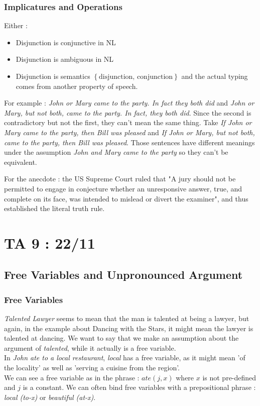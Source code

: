 \documentclass{cours}
\begin{document}
\subsubsection{Implicatures and Operations}
Either\! : 
\begin{itemize}
    \item Disjunction is conjunctive in NL
    \item Disjunction is ambiguous in NL
    \item Disjunction is semantics $\left\{\text{disjunction, conjunction}\right\}$ and the actual typing comes from another property of speech. 
\end{itemize}

For example\! : \textsl{John or Mary came to the party. In fact they both did} and \textsl{John or Mary, but not both, came to the party. In fact, they both did}. Since the second is contradictory but not the first, they can't mean the same thing. 
Take \textsl{If John or Mary came to the party, then Bill was pleased} and \textsl{If John or Mary, but not both, came to the party, then Bill was pleased}. Those sentences have different meanings under the assumption \textsl{John and Mary came to the party} so they can't be equivalent. 

For the anecdote\! : the US Supreme Court ruled that "A jury should not be permitted to engage in conjecture whether an unresponsive answer, true, and complete on its face, was intended to mislead or divert the examiner", and thus established the literal truth rule. 

\section{TA 9\! : 22/11}
\subsection{Free Variables and Unpronounced Argument}
\subsubsection{Free Variables}
\textsl{Talented Lawyer} seems to mean that the man is talented at being a lawyer, but again, in the example about Dancing with the Stars, it might mean the lawyer is talented at dancing. We want to say that we make an assumption about the argument of \textsl{talented}, while it actually is a free variable. \\
In \textsl{John ate to a local restaurant}, \textsl{local} has a free variable, as it might mean 'of the locality' as well as 'serving a cuisine from the region'.\\
We can see a free variable as in the phrase\! : $ate(j, x)$ where $x$ is not pre-defined and $j$ is a constant.
We can often bind free variables with a prepositional phrase\! : \textsl{local (to-x)} or \textsl{beautiful (at-x)}.
\end{document}
